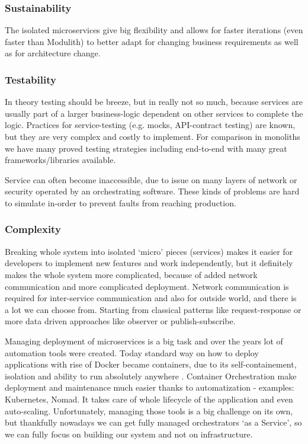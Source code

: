 \subsubsection{Sustainability}
The isolated microservices give big flexibility and allows for faster iterations (even faster than Modulith) to better adapt for changing business requirements as well as for architecture change.

\subsubsection{Testability}
In theory testing should be breeze, but in really not so much, because services are usually part of a larger business-logic dependent on other services to complete the logic. Practices for service-testing (e.g. mocks, API-contract testing) are known, but they are very complex and costly to implement. For comparison in  monoliths we have many proved testing strategies including end-to-end with many great frameworks/libraries available. \cite{MC_TESTABILITY}

Service can often become inaccessible, due to issue on many layers of network or security operated by an orchestrating software. These kinds of problems are hard to simulate in-order to prevent faults from reaching production.

\subsubsection{Complexity}
\label{section:microservices:complexity}
Breaking whole system into isolated `micro' pieces (services) makes it easier for developers to implement new features and work independently, but it definitely makes the whole system more complicated, because of added network communication and more complicated deployment. Network communication is required for inter-service communication and also for outside world, and there is a lot we can choose from. Starting from classical patterns like request-response or more data driven approaches like observer or publish-subscribe.

Managing deployment of microservices is a big task and over the years lot of automation tools were created. Today standard way on how to deploy applications with rise of Docker became containers, due to its self-containement, isolation and ability to run absolutely anywhere \cite{7093032}. Container Orchestration make deployment and maintenance much easier thanks to automatization - examples: Kubernetes\cite{KUBERNETES}, Nomad\cite{NOMAD}. It takes care of whole lifecycle of the application and even auto-scaling. Unfortunately, managing those tools is a big challenge on its own, but thankfully nowadays we can get fully managed orchestrators `as a Service', so we can fully focus on building our system and not on infrastructure.

